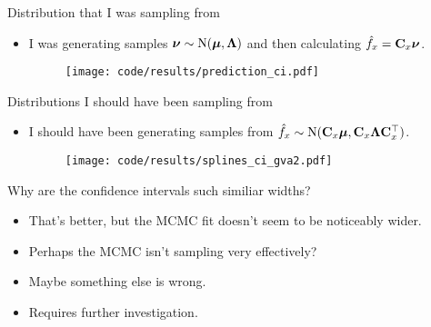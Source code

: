 \documentclass{beamer}
\begin{document}
\begin{frame}{Distribution that I was sampling from}
\begin{itemize}
\item I was generating samples ${\boldsymbol \nu} \sim \text{N}({\boldsymbol \mu}, {\boldsymbol \Lambda})$ and then 
calculating $\hat{f}_x = {\bf C}_x {\boldsymbol \nu}$.
\begin{figure}
\texttt{[image: code/results/prediction\_ci.pdf]}
\end{figure}
\end{itemize}
\end{frame}

\begin{frame}{Distributions I should have been sampling from}
\begin{itemize}
\item I should have been generating samples from $\hat{f}_x \sim \text{N}({\bf C}_x {\boldsymbol \mu}, {\bf C}_x {\boldsymbol \Lambda} {\bf C}_x^\top)$.
\begin{figure}
\texttt{[image: code/results/splines\_ci\_gva2.pdf]}
\end{figure}
\end{itemize}
\end{frame}

\begin{frame}{Why are the confidence intervals such similiar widths?}
\begin{itemize}
\item That's better, but the MCMC fit doesn't seem to be noticeably wider.
\item Perhaps the MCMC isn't sampling very effectively?
\item Maybe something else is wrong.
\item Requires further investigation.
\end{itemize}
\end{frame}
\end{document}
